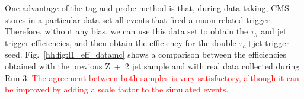 \documentclass[../main.tex]{subfiles}
\begin{document}
One advantage of the tag and probe method is that, during data-taking, CMS stores in a particular data set all events that fired a muon-related trigger. Therefore, without any bias, we can use this data set to obtain the $\tau_h$ and jet trigger efficiencies, and then obtain the efficiency for the double-$\tau_h$+jet trigger seed. Fig.~\ref{hh:fig:l1_eff_datamc} shows a comparison between the efficiencies obtained with the previous Z~+~2 jet sample and with real data collected during Run 3. \textcolor{red}{The agreement between both samples is very satisfactory, although it can be improved by adding a scale factor to the simulated events.}

\begin{figure}[h!]
\begin{center}
\\

\end{center}
\end{figure}
\end{document}
